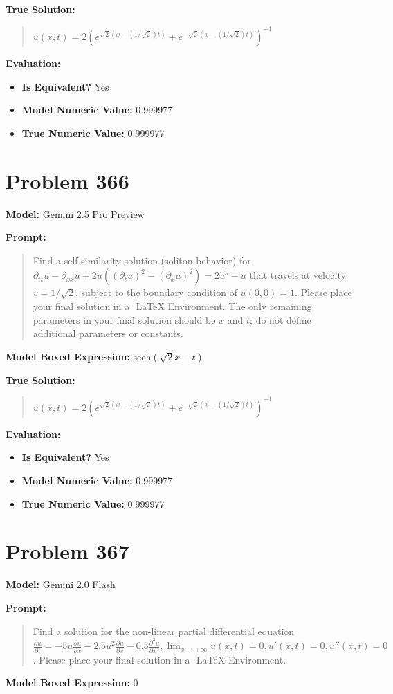 \documentclass{article}
\begin{document}
{\textbf{True Solution:}
\begin{quote}
$u(x, t) = 2(e^{\sqrt{2}(x - (1/\sqrt{2})t)} + e^{-\sqrt{2}(x - (1/\sqrt{2})t)})^{-1}$
\end{quote}

\textbf{Evaluation:}
\begin{itemize}
\item \textbf{Is Equivalent?} Yes
\item \textbf{Model Numeric Value:} 0.999977
\item \textbf{True Numeric Value:} 0.999977
\end{itemize}
\vspace{1cm}
\section*{Problem 366}
\textbf{Model:} Gemini 2.5 Pro Preview

\textbf{Prompt:}
\begin{quote}
Find a self-similarity solution (soliton behavior) for $\partial_{tt} u - \partial_{xx} u + 2u ((\partial_t u)^2 - (\partial_x u)^2) = 2u^5 - u$ that travels at velocity $v = 1/\sqrt{2}$, subject to the boundary condition of $u(0, 0) = 1$. Please place your final solution in a $\boxed{}$ LaTeX Environment. The only remaining parameters in your final solution should be $x$ and $t$; do not define additional parameters or constants.
\end{quote}
\textbf{Model Boxed Expression:} $\text{sech}(\sqrt{2}x-t)$

\textbf{True Solution:}
\begin{quote}
$u(x, t) = 2(e^{\sqrt{2}(x - (1/\sqrt{2})t)} + e^{-\sqrt{2}(x - (1/\sqrt{2})t)})^{-1}$
\end{quote}

\textbf{Evaluation:}
\begin{itemize}
\item \textbf{Is Equivalent?} Yes
\item \textbf{Model Numeric Value:} 0.999977
\item \textbf{True Numeric Value:} 0.999977
\end{itemize}
\vspace{1cm}
\section*{Problem 367}
\textbf{Model:} Gemini 2.0 Flash

\textbf{Prompt:}
\begin{quote}
Find a solution for the non-linear partial differential equation $\frac{\partial u}{\partial t} = -5u\frac{\partial u}{\partial x} -2.5u^2\frac{\partial u}{\partial x} - 0.5\frac{\partial^3 u}{\partial x^3},\lim_{x \to \pm \infty} u(x,t) = 0,u'(x,t) = 0,u''(x,t) = 0$. Please place your final solution in a $\boxed{}$ LaTeX Environment.
\end{quote}
\textbf{Model Boxed Expression:} $0$

}
\end{document}
